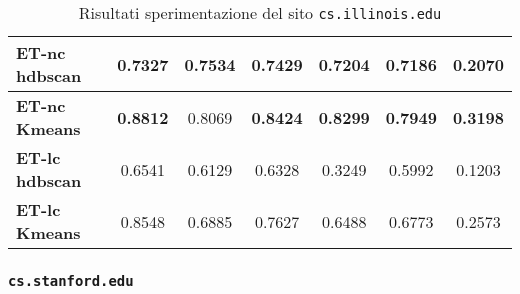 \begin{table}[H]
\begin{tabular}{| l | c | c | c | c | c | c |}
	\textbf{ET-nc hdbscan} & 0.7327 & 0.7534 & 0.7429 & 0.7204 & 0.7186 & 0.2070\\ [2ex]
	 \hline 
	\textbf{ET-nc Kmeans} & \textbf{0.8812} & 0.8069 & \textbf{0.8424} & \textbf{0.8299} & \textbf{0.7949} & \textbf{0.3198}\\ [2ex]
	 \hline
	\textbf{ET-lc hdbscan} & 0.6541 & 0.6129 & 0.6328 & 0.3249 & 0.5992 & 0.1203\\ [2ex]
	\hline
	\textbf{ET-lc Kmeans} & 0.8548 & 0.6885 & 0.7627 & 0.6488 & 0.6773 & 0.2573\\ [2ex]
	\hline	
	
	\end{tabular}
	\caption{Risultati sperimentazione del sito \texttt{cs.illinois.edu}}
	\label{metricheIll}
\end{table}

\subsubsection{\texttt{cs.stanford.edu}}

